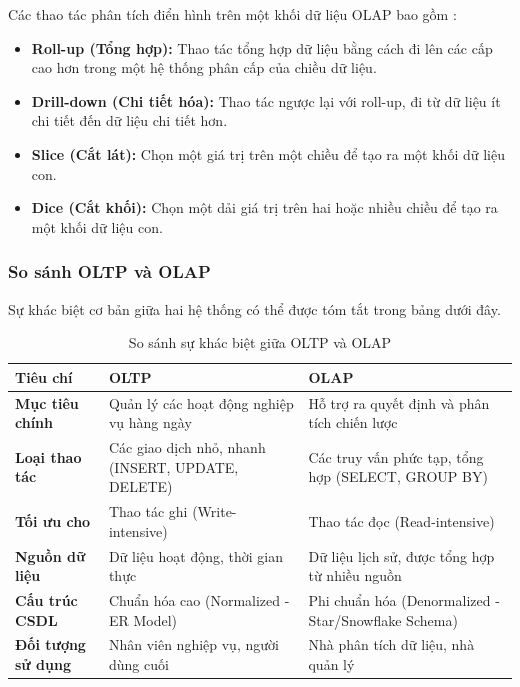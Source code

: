 Các thao tác phân tích điển hình trên một khối dữ liệu OLAP bao gồm \cite{han2011datamining}:
\begin{itemize}
    \item \textbf{Roll-up (Tổng hợp):} Thao tác tổng hợp dữ liệu bằng cách đi lên các cấp cao hơn trong một hệ thống phân cấp của chiều dữ liệu.
    \item \textbf{Drill-down (Chi tiết hóa):} Thao tác ngược lại với roll-up, đi từ dữ liệu ít chi tiết đến dữ liệu chi tiết hơn.
    \item \textbf{Slice (Cắt lát):} Chọn một giá trị trên một chiều để tạo ra một khối dữ liệu con.
    \item \textbf{Dice (Cắt khối):} Chọn một dải giá trị trên hai hoặc nhiều chiều để tạo ra một khối dữ liệu con.
\end{itemize}

\subsubsection{So sánh OLTP và OLAP}
Sự khác biệt cơ bản giữa hai hệ thống có thể được tóm tắt trong bảng dưới đây.
\begin{table}[ht!]
    \centering
    \begin{tabular}{|l|p{5.5cm}|p{5.5cm}|}
        \hline
        \textbf{Tiêu chí} & \textbf{OLTP} & \textbf{OLAP} \\
        \hline
        \textbf{Mục tiêu chính} & Quản lý các hoạt động nghiệp vụ hàng ngày & Hỗ trợ ra quyết định và phân tích chiến lược \\
        \hline
        \textbf{Loại thao tác} & Các giao dịch nhỏ, nhanh (INSERT, UPDATE, DELETE) & Các truy vấn phức tạp, tổng hợp (SELECT, GROUP BY) \\
        \hline
        \textbf{Tối ưu cho} & Thao tác ghi (Write-intensive) & Thao tác đọc (Read-intensive) \\
        \hline
        \textbf{Nguồn dữ liệu} & Dữ liệu hoạt động, thời gian thực & Dữ liệu lịch sử, được tổng hợp từ nhiều nguồn \\
        \hline
        \textbf{Cấu trúc CSDL} & Chuẩn hóa cao (Normalized - ER Model) & Phi chuẩn hóa (Denormalized - Star/Snowflake Schema) \\
        \hline
        \textbf{Đối tượng sử dụng} & Nhân viên nghiệp vụ, người dùng cuối & Nhà phân tích dữ liệu, nhà quản lý \\
        \hline
    \end{tabular}
    \caption{So sánh sự khác biệt giữa OLTP và OLAP}
    \label{tab:oltp_olap_comparison}
\end{table}

